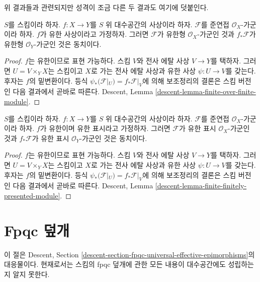 \noindent
위 결과들과 관련되지만 성격이 조금 다른 두 결과도 여기에 덧붙인다.

\begin{lemma}
\label{lemma-finite-over-finite-module}
$S$를 스킴이라 하자. $f:X\to Y$를 $S$ 위 대수공간의 사상이라 하자.
$\mathcal{F}$를 준연접 $\mathcal{O}_X$-가군이라 하자. $f$가 유한
사상이라고 가정하자. 그러면 $\mathcal{F}$가 유한형
$\mathcal{O}_X$-가군인 것과 $f_*\mathcal{F}$가 유한형
$\mathcal{O}_Y$-가군인 것은 동치이다.
\end{lemma}

\begin{proof}
$f$는 유한이므로 표현 가능하다. 스킴 $V$와 전사 에탈 사상 $V\to Y$를
택하자. 그러면 $U=V\times_YX$는 스킴이고 $X$로 가는 전사 에탈 사상과
유한 사상 $\psi:U\to V$를 갖는다. 후자는 $f$의 밑변환이다. 등식
$\psi_*(\mathcal{F}|_U)=f_*\mathcal{F}|_V$에 의해 보조정리의 결론은
스킴 버전인 다음 결과에서 곧바로 따른다.
Descent, Lemma \ref{descent-lemma-finite-over-finite-module}.
\end{proof}

\begin{lemma}
\label{lemma-finite-finitely-presented-module}
$S$를 스킴이라 하자. $f:X\to Y$를 $S$ 위 대수공간의 사상이라 하자.
$\mathcal{F}$를 준연접 $\mathcal{O}_X$-가군이라 하자. $f$가 유한이며
유한 표시라고 가정하자. 그러면 $\mathcal{F}$가 유한 표시
$\mathcal{O}_X$-가군인 것과 $f_*\mathcal{F}$가 유한 표시
$\mathcal{O}_Y$-가군인 것은 동치이다.
\end{lemma}

\begin{proof}
$f$는 유한이므로 표현 가능하다. 스킴 $V$와 전사 에탈 사상 $V\to Y$를
택하자. 그러면 $U=V\times_YX$는 스킴이고 $X$로 가는 전사 에탈 사상과
유한 사상 $\psi:U\to V$를 갖는다. 후자는 $f$의 밑변환이다. 등식
$\psi_*(\mathcal{F}|_U)=f_*\mathcal{F}|_V$에 의해 보조정리의 결론은
스킴 버전인 다음 결과에서 곧바로 따른다.
Descent, Lemma \ref{descent-lemma-finite-finitely-presented-module}.
\end{proof}

\section{Fpqc 덮개}
\label{section-fpqc}

\noindent
이 절은 Descent, Section
\ref{descent-section-fpqc-universal-effective-epimorphisms}의 대응물이다.
현재로서는 스킴의 fpqc 덮개에 관한 모든 내용이 대수공간에도 성립하는지
알지 못한다.

